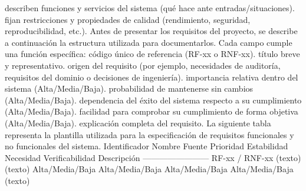 \markdownRendererUlItem {} describen funciones y servicios del sistema (qué hace ante entradas/situaciones).\markdownRendererUlItemEnd 
\markdownRendererUlItem {} fijan restricciones y propiedades de calidad (rendimiento, seguridad, reproducibilidad, etc.).\markdownRendererUlItemEnd 
\markdownRendererUlEndTight \markdownRendererInterblockSeparator
{}Antes de presentar los requisitos del proyecto, se describe a continuación la estructura utilizada para documentarlos. Cada campo cumple una función específica:\markdownRendererInterblockSeparator
{}\markdownRendererUlBeginTight
\markdownRendererUlItem {} código único de referencia (RF-xx o RNF-xx).\markdownRendererUlItemEnd 
\markdownRendererUlItem {} título breve y representativo.\markdownRendererUlItemEnd 
\markdownRendererUlItem {} origen del requisito (por ejemplo, necesidades de auditoría, requisitos del dominio o decisiones de ingeniería).\markdownRendererUlItemEnd 
\markdownRendererUlItem {} importancia relativa dentro del sistema (Alta/Media/Baja).\markdownRendererUlItemEnd 
\markdownRendererUlItem {} probabilidad de mantenerse sin cambios (Alta/Media/Baja).\markdownRendererUlItemEnd 
\markdownRendererUlItem {} dependencia del éxito del sistema respecto a su cumplimiento (Alta/Media/Baja).\markdownRendererUlItemEnd 
\markdownRendererUlItem {} facilidad para comprobar su cumplimiento de forma objetiva (Alta/Media/Baja).\markdownRendererUlItemEnd 
\markdownRendererUlItem {} explicación completa del requisito.\markdownRendererUlItemEnd 
\markdownRendererUlEndTight \markdownRendererInterblockSeparator
{}La siguiente tabla representa la plantilla utilizada para la especificación de requisitos funcionales y no funcionales del sistema.\markdownRendererInterblockSeparator
{}\markdownRendererInterblockSeparator
{}\markdownRendererPipe{} Identificador \markdownRendererPipe{} Nombre \markdownRendererPipe{} Fuente \markdownRendererPipe{} Prioridad \markdownRendererPipe{} Estabilidad \markdownRendererPipe{} Necesidad \markdownRendererPipe{} Verificabilidad \markdownRendererPipe{} Descripción \markdownRendererPipe{} \markdownRendererPipe{}---\markdownRendererPipe{}---\markdownRendererPipe{}---\markdownRendererPipe{}---\markdownRendererPipe{}---\markdownRendererPipe{}---\markdownRendererPipe{}---\markdownRendererPipe{}---\markdownRendererPipe{} \markdownRendererPipe{} RF-xx / RNF-xx \markdownRendererPipe{} (texto) \markdownRendererPipe{} (texto) \markdownRendererPipe{} Alta/Media/Baja \markdownRendererPipe{} Alta/Media/Baja \markdownRendererPipe{} Alta/Media/Baja \markdownRendererPipe{} Alta/Media/Baja \markdownRendererPipe{} (texto) \markdownRendererPipe{}\markdownRendererInterblockSeparator
